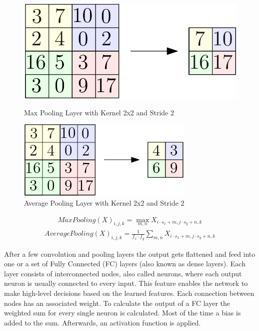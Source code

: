 \documentclass[
a4paper, 
12pt,
grayscalebody, %
abstract=on,
twoside, BCOR10mm, 12pt, DIV13,headinclude, footexclude, final, abstracton, openright
]{ibireprt}
\numberwithin{equation}{chapter}
\numberwithin{table}{chapter}
\numberwithin{figure}{chapter}
\numberwithin{algorithm}{chapter}
\numberwithin{example}{chapter}
\numberwithin{example}{chapter}
\begin{document}
\begin{figure}[h]
	\centering
	\begin{minipage}[t]{.45\linewidth}
		\centering
		\includegraphics[width = \textwidth]{max_pool.png}%
		\caption{Max Pooling Layer with Kernel 2x2 and Stride 2}
		\label{fig:fig_max_pooling}
		
	\end{minipage}
	\hfill
	\begin{minipage}[t]{.45\linewidth}
		\centering
		\includegraphics[width = \textwidth]{average_pool.png}%
		\caption{Average Pooling Layer with Kernel 2x2 and Stride 2}
		\label{fig:fig_average_pooling}
	\end{minipage}
\end{figure}
\begin{align}
	MaxPooling(X)_{i,j,k} = \max_{m,n}X_{i\cdot s_x + m, j \cdot s_y+n,k}
\end{align}
\begin{align}
	AveragePooling(X)_{i,j,k} =\frac{1}{f_x\cdot f_y}\sum_{m,n} X_{i\cdot s_x + m, j \cdot s_y+n,k}
\end{align}

After a few convolution and pooling layers the output gets flattened and feed into one or a set of Fully Connected (FC) layers (also known as dense layers). Each layer consists of interconnected nodes, also called neurons, where each output neuron is usually connected to every input. This feature enables the network to make high-level decisions based on the learned features. Each connection between nodes has an associated weight. To calculate the output of a FC layer the weighted sum for every single neuron is calculated. Most of the time a bias is added to the sum. Afterwards, an activation function is applied. 
\end{document}
